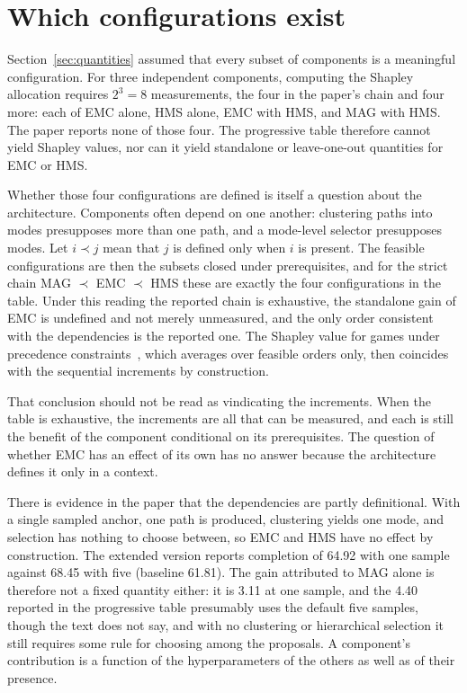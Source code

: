 \documentclass[11pt]{article}
\theoremstyle{plain}
\theoremstyle{remark}
\begin{document}
\section{Which configurations exist}\label{sec:exist}

Section~\ref{sec:quantities} assumed that every subset of components is a meaningful configuration. For three independent components, computing the Shapley allocation requires $2^3=8$ measurements, the four in the paper's chain and four more: each of EMC alone, HMS alone, EMC with HMS, and MAG with HMS. The paper reports none of those four. The progressive table therefore cannot yield Shapley values, nor can it yield standalone or leave-one-out quantities for EMC or HMS.

Whether those four configurations are defined is itself a question about the architecture. Components often depend on one another: clustering paths into modes presupposes more than one path, and a mode-level selector presupposes modes. Let $i\prec j$ mean that $j$ is defined only when $i$ is present. The feasible configurations are then the subsets closed under prerequisites, and for the strict chain MAG $\prec$ EMC $\prec$ HMS these are exactly the four configurations in the table. Under this reading the reported chain is exhaustive, the standalone gain of EMC is undefined and not merely unmeasured, and the only order consistent with the dependencies is the reported one. The Shapley value for games under precedence constraints~\cite{faigle1992}, which averages over feasible orders only, then coincides with the sequential increments by construction.

That conclusion should not be read as vindicating the increments. When the table is exhaustive, the increments are all that can be measured, and each is still the benefit of the component conditional on its prerequisites. The question of whether EMC has an effect of its own has no answer because the architecture defines it only in a context.

There is evidence in the paper that the dependencies are partly definitional. With a single sampled anchor, one path is produced, clustering yields one mode, and selection has nothing to choose between, so EMC and HMS have no effect by construction. The extended version reports completion of 64.92 with one sample against 68.45 with five (baseline 61.81). The gain attributed to MAG alone is therefore not a fixed quantity either: it is 3.11 at one sample, and the 4.40 reported in the progressive table presumably uses the default five samples, though the text does not say, and with no clustering or hierarchical selection it still requires some rule for choosing among the proposals. A component's contribution is a function of the hyperparameters of the others as well as of their presence.
\end{document}

